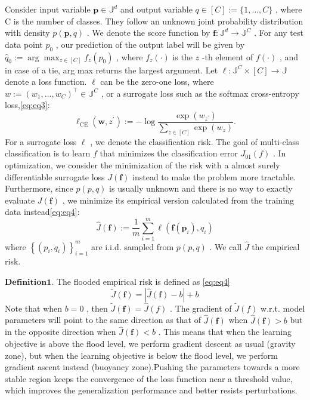 \documentclass[a4paper,fleqn]{cas-sc}
\begin{document}
Consider input variable  $\boldsymbol{p} \in \mathbb{J}^{d}$  and output variable  $q \in   [C]:=\{1, \ldots, C\}$ , where  C  is the number of classes. They follow an unknown joint probability distribution with density  $p(\boldsymbol{p}, q)$ . We denote the score function by  $\boldsymbol{f}: \mathbb{J}^{d} \rightarrow   \mathbb{J}^{C}$ . For any test data point  $p_{0}$ , our prediction of the output label will be given by  $\widehat{q}_{0}:=\arg \max _{z \in[C]} f_{z}\left(p_{0}\right)$ , where  $f_{z}(\cdot)$  is the  $z$ -th element of  $f(\cdot)$ , and in case of a tie, arg max returns the largest argument. Let  $\ell: \mathbb{J}^{C} \times[C] \rightarrow \mathbb{J}$  denote a loss function.  $\ell$  can be the zero-one loss, where  $w:=\left(w_{1}, \ldots, w_{C}\right)^{\top} \in \mathbb{J}^{C}$ , or a surrogate loss such as the softmax cross-entropy loss,\ref{eq:eq3}:
\begin{equation}
\label{eq:eq3}
\ell_{\mathrm{CE}}\left(\boldsymbol{w}, z^{\prime}\right):=-\log \frac{\exp \left(w_{z^{\prime}}\right)}{\sum_{z \in[C]} \exp \left(w_{z}\right)} .
\end{equation}
For a surrogate loss  $\ell$ , we denote the classification risk.
The goal of multi-class classification is to learn  $f$  that minimizes the classification error  $J_{01}(f)$ . In optimization, we consider the minimization of the risk with a almost surely differentiable surrogate loss  $J(\boldsymbol{f})$  instead to make the problem more tractable. Furthermore, since  $p(p, q)$  is usually unknown and there is no way to exactly evaluate  $J(\boldsymbol{f})$ , we minimize its empirical version calculated from the training data instead\ref{eq:eq4}:
\begin{equation}
\label{eq:eq4}
\widehat{J}(\boldsymbol{f}):=\frac{1}{m} \sum_{i=1}^{m} \ell\left(\boldsymbol{f}\left(\boldsymbol{p}_{i}\right), q_{i}\right)
\end{equation}
where  $\left\{\left(p_{i}, q_{i}\right)\right\}_{i=1}^{m}$  are i.i.d. sampled from  $p(p, q)$ . We call  $\widehat{J}$  the empirical risk.

$\mathbf{Definition 1.}$ The flooded empirical risk is defined  as \ref{eq:eq4} 
\begin{equation}
\widetilde{J}(\boldsymbol{f})=|\widehat{J}(\boldsymbol{f})-b|+b
\end{equation}
Note that when  $b=0$ , then  $\widetilde{J}(\boldsymbol{f})=\widehat{J}(f)$ . The gradient of  $\widetilde{J}(f)$  w.r.t. model parameters will point to the same direction as that of  $\widehat{J}(\boldsymbol{f})$  when  $\widehat{J}(\boldsymbol{f})>b$  but in the opposite direction when  $\widehat{J}(\boldsymbol{f})<b$ . This means that when the learning objective is above the flood level, we perform gradient descent as usual (gravity zone), but when the learning objective is below the flood level, we perform gradient ascent instead (buoyancy zone).Pushing the parameters towards a more stable region keeps the convergence of the loss function near a threshold value, which improves the generalization performance and better resists perturbations.
%
\end{document}
